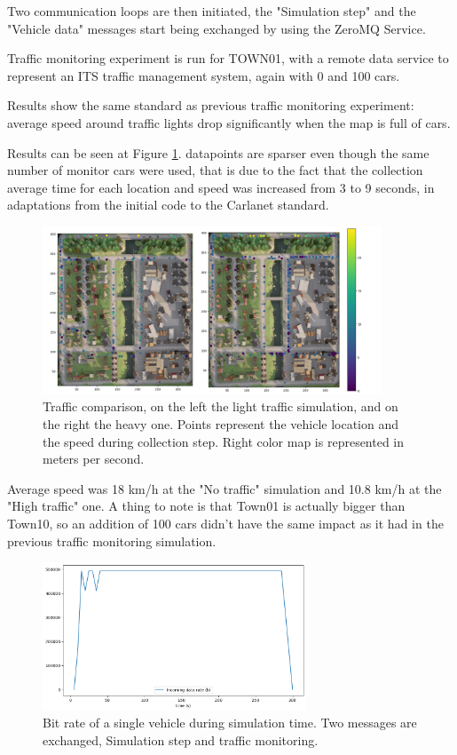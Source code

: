 Two communication loops are then initiated, the "Simulation step" and the "Vehicle data" messages start being exchanged by using the ZeroMQ Service.

Traffic monitoring experiment is run for TOWN01, with a remote data service to represent an ITS traffic management system, again with 0 and 100 cars.

Results show the same standard as previous traffic monitoring experiment: average speed around traffic lights drop significantly when the map is full of cars. 

Results can be seen at Figure \ref{fig:traffic-monitoring-network}. datapoints are sparser even though the same number of monitor cars were used, that is due to the fact that the collection average time for each location and speed was increased from 3 to 9 seconds, in adaptations from the initial code to the Carlanet standard.

\begin{figure} [!ht]
    \centering
    \includegraphics[width=0.9\textwidth]{parts/figuras/traffic-comparison-network.pdf}
    \caption{Traffic comparison, on the left the light traffic simulation, and on the right the heavy one. Points represent the vehicle location and the speed during collection step. Right color map is represented in meters per second.}
    \label{fig:traffic-monitoring-network}
\end{figure}

Average speed was 18 km/h at the "No traffic" simulation and 10.8 km/h at the "High traffic" one. A thing to note is that Town01 is actually bigger than Town10, so an addition of 100 cars didn't have the same impact as it had in the previous traffic monitoring simulation.

\begin{figure} [h!]
    \centering
    \includegraphics[width=0.7\textwidth]{parts/figuras/bitrate-1-car.png}
    \caption{Bit rate of a single vehicle during simulation time. Two messages are exchanged, Simulation step and traffic monitoring.}
    \label{fig:bitrate-1-vehicle}
\end{figure}

